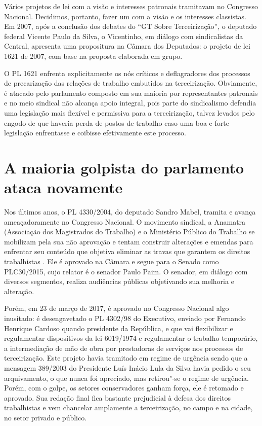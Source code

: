 Vários projetos de lei com a visão e interesses patronais tramitavam no
Congresso Nacional. Decidimos, portanto, fazer um com a visão e os
interesses classistas. Em 2007, após a conclusão dos debates do ``GT
Sobre Terceirização'', o deputado federal Vicente Paulo da Silva, o
Vicentinho, em diálogo com sindicalistas da Central, apresenta uma
propositura na Câmara dos Deputados: o projeto de lei 1621 de 2007, com
base na proposta elaborada em grupo.

O PL 1621 enfrenta explicitamente os nós críticos e deflagradores dos
processos de precarização das relações de trabalho embutidos na
terceirização. Obviamente, é atacado pelo parlamento composto em sua
maioria por representantes patronais e no meio sindical não alcança
apoio integral, pois parte do sindicalismo defendia uma legislação mais
flexível e permissiva para a terceirização, talvez levados pelo engodo
de que haveria perda de postos de trabalho caso uma boa e forte
legislação enfrentasse e coibisse efetivamente este processo.

\section{A maioria golpista do parlamento ataca novamente}

Nos últimos anos, o PL 4330/2004, do deputado Sandro Mabel, tramita e
avança ameaçadoramente no Congresso Nacional. O movimento sindical, a
Anamatra (Associação dos Magistrados do Trabalho) e o Ministério Público
do Trabalho se mobilizam pela sua não aprovação e tentam construir
alterações e emendas para enfrentar seu conteúdo que objetiva eliminar
as travas que garantem os direitos trabalhistas . Ele é aprovado na
Câmara e segue para o Senado como PLC30/2015, cujo relator é o senador
Paulo Paim. O senador, em diálogo com diversos segmentos, realiza
audiências públicas objetivando sua melhoria e alteração.

Porém, em 23 de março de 2017, é aprovado no Congresso Nacional algo
inusitado: é desengavetado o PL 4302/98 do Executivo, enviado por
Fernando Henrique Cardoso quando presidente da República, e que vai
flexibilizar e regulamentar dispositivos da lei 6019/1974 e regulamentar
o trabalho temporário, a intermediação de mão de obra por prestadoras de
serviços nos processos de terceirização. Este projeto havia tramitado em
regime de urgência sendo que a mensagem 389/2003 do Presidente Luís
Inácio Lula da Silva havia pedido o seu arquivamento, o que nunca foi
apreciado, mas retirou"-se o regime de urgência. Porém, com o golpe, os
setores conservadores ganham força, ele é retomado e aprovado. Sua
redação final fica bastante prejudicial à defesa dos direitos
trabalhistas e vem chancelar amplamente a terceirização, no campo e na
cidade, no setor privado e público.

